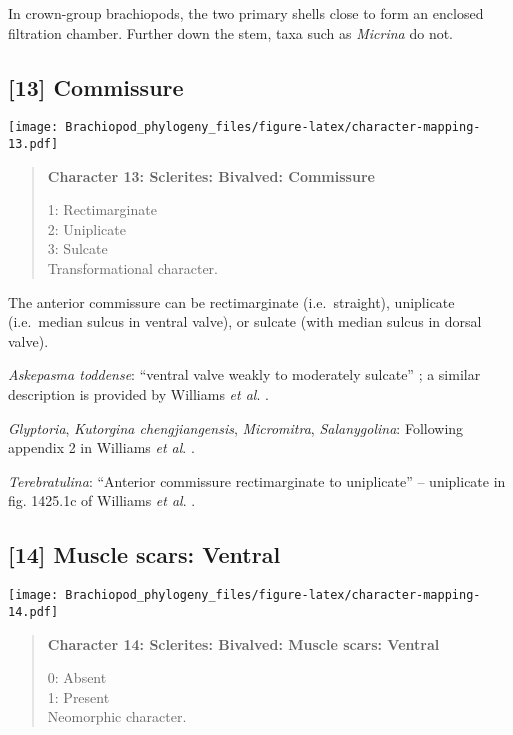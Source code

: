 \documentclass[openany]{book}
\theoremstyle{definition}
\theoremstyle{definition}
\theoremstyle{definition}
\theoremstyle{remark}
\begin{document}
In crown-group brachiopods, the two primary shells close to form an
enclosed filtration chamber. Further down the stem, taxa such as
\emph{Micrina} do not.

\subsection*{{[}13{]} Commissure}\label{commissure}

\texttt{[image: Brachiopod\_phylogeny\_files/figure-latex/character-mapping-13.pdf]}

\begin{quote}
\textbf{Character 13: Sclerites: Bivalved: Commissure}

1: Rectimarginate\\
2: Uniplicate\\
3: Sulcate\\
Transformational character.
\end{quote}

The anterior commissure can be rectimarginate (i.e.~straight),
uniplicate (i.e.~median sulcus in ventral valve), or sulcate (with
median sulcus in dorsal valve).

\hypertarget{Askepasma_toddense-coding-13}{}
\emph{Askepasma toddense}: ``ventral valve weakly to moderately
sulcate'' \citep{Topper2013Theoldest}; a similar description is provided
by Williams \emph{et al}.
\citeyearpar{Williams2000LinguliformeaCraniiformea}.

\hypertarget{Glyptoria-coding-13}{}
\emph{Glyptoria}, \emph{Kutorgina chengjiangensis}, \emph{Micromitra},
\emph{Salanygolina}: Following appendix 2 in Williams \emph{et al}.
\citeyearpar{Williams1998Thediversity}.

\hypertarget{Terebratulina-coding-13}{}
\emph{Terebratulina}: ``Anterior commissure rectimarginate to
uniplicate'' -- uniplicate in fig. 1425.1c of Williams \emph{et al}.
\citeyearpar{Williams2006Rhynchonelliformeapart}.

\subsection*{{[}14{]} Muscle scars: Ventral}\label{muscle-scars-ventral}

\texttt{[image: Brachiopod\_phylogeny\_files/figure-latex/character-mapping-14.pdf]}

\begin{quote}
\textbf{Character 14: Sclerites: Bivalved: Muscle scars: Ventral }

0: Absent\\
1: Present\\
Neomorphic character.
\end{quote}
\end{document}
